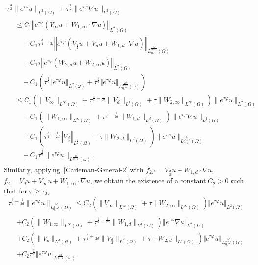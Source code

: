 \documentclass[AHL,Unicode,longabstracts]{cedram}
\newcommand{\norm}[1]{\left\Vert#1\right\Vert}
\renewcommand{\leq}{\leqslant}
\renewcommand{\geq}{\geqslant}
\begin{document}
\begin{multline}\label{Carleman-General-1-appl}
\tau^{\frac{3}{2}} \| e^{\tau \varphi} u \|_{L^2(\Omega)} +
\tau^{\frac{1}{2}} \| e^{\tau \varphi} \nabla u \|_{L^2(\Omega)}\\
\begin{aligned}
&\leq C_1
\norm{e^{\tau \varphi} (V_{\infty} u+ W_{1,\infty} \cdot \nabla u)}_{L^2(\Omega)}
\\
&\quad +C_1
\tau^{\frac{3}{4}-\frac{1}{2d}} \norm{e^{\tau \varphi}\left(V_{\frac{d}{2}} u + V_{d} u+ W_{1,d} \cdot \nabla u\right)}_{L^{\frac{2d}{d+2}}_{\eta, \tau} (\Omega)}
\\
&\quad + C_1 \tau \norm{ e^{\tau \varphi}\left(W_{2,d} u + W_{2, \infty} u\right)}_{L^2(\Omega)}\\
&\quad + C_1 \left(\tau^{\frac{3}{2}} \norm{ e^{\tau \varphi} u}_{L^2(\omega)} + \tau^{\frac{3}{4}}\norm{ e^{\tau \varphi} u}_{L^{\frac{2d}{d-2}}_{\eta, \tau} (\omega)}\right)
\\
&\leq C_1 \left(\| V_\infty \|_{L^\infty(\Omega)} + \tau^{\frac{3}{4}-\frac{1}{2d}} \| V_{d} \|_{L^d(\Omega)} + \tau \| W_{2, \infty}\|_{L^\infty(\Omega)} \right)
\| e^{\tau \varphi} u \|_{L^2(\Omega)}
\\
&\quad + C_1 \left(\| W_{1,\infty} \|_{L^\infty(\Omega)} + \tau^{\frac{3}{4}-\frac{1}{2d}} \| W_{1,d} \|_{L^d(\Omega)} \right)
\| e^{\tau \varphi} \nabla u \|_{L^2(\Omega)}
\\
&\quad + C_1 \left(\tau^{\frac{3}{4}-\frac{1}{2d}} \norm{V_{\frac{d}{2}}}_{L^{\frac{d}{2}}(\Omega)} + \tau \| W_{2, d}\|_{L^d(\Omega)} \right)
\| e^{\tau \varphi} u \|_{L^{\frac{2d}{d-2}}_{\eta, \tau}(\Omega)}\\
&\quad + C_1 \tau^{\frac{3}{2}} \| e^{\tau \varphi} u\|_{L^{\frac{2d}{d-2}} (\omega)}.
\end{aligned}
\end{multline}
Similarly, applying~\eqref{Carleman-General-2} with $f_{2_*'} = V_{\frac{d}{2}} u + W_{1,d} \cdot \nabla u$, $f_2 = V_{d} u + V_{\infty} u+ W_{1,\infty} \cdot \nabla u$, we obtain the existence of a constant $C_2>0 $ such that for $\tau \geq \tau_0$,
\begin{multline}\label{Carleman-General-2-appl}
\tau^{\frac{3}{4}+\frac{1}{2d}} \| e^{\tau \varphi} u \|_{L^{\frac{2d}{d-2}}_{\eta,\tau} (\Omega)}
\leq C_2 \left(\| V_\infty \|_{L^\infty(\Omega)} + \tau \| W_{2, \infty}\|_{L^\infty(\Omega)} \right)
\norm{e^{\tau \varphi} u}_{L^2(\Omega)}
\\
\begin{aligned}
&+ C_2 \left(\| W_{1,\infty} \|_{L^\infty(\Omega)} + \tau^{\frac{3}{4}+\frac{1}{2d}} \| W_{1,d} \|_{L^d(\Omega)} \right)
\norm{e^{\tau \varphi} \nabla u}_{L^2(\Omega)}
\\
&+ C_2 \left(\| V_{d} \|_{L^d(\Omega)} \! + \tau^{\frac{3}{4}+\frac{1}{2d}} \| V_{\frac{d}{2}} \|_{L^{\frac{d}{2}}(\Omega)}\!\! + \tau \| W_{2, d}\|_{L^d(\Omega)} \right)
\norm{e^{\tau \varphi} u }_{L^{\frac{2d}{d-2}}_{\eta, \tau}(\Omega)} \\
&+ C_2\tau^{\frac{3}{2}} \norm{e^{\tau \varphi} u}_{L^{\frac{2d}{d-2}} (\omega)}.
\end{aligned}
\end{multline}
\end{document}
